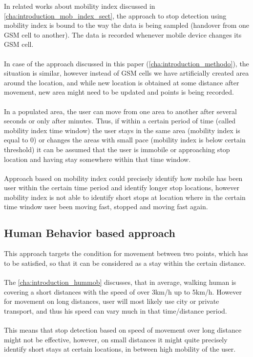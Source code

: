 In related works about mobility index discussed in \autoref{cha:introduction_mob_index_sect}, the approach to stop detection using mobility index is bound to the way the data is being sampled (handover from one GSM cell to another). The data is recorded whenever mobile device changes its GSM cell. 
\\\\
In case of the approach discussed in this paper (\autoref{cha:introduction_methodo}), the situation is similar, however instead of GSM cells we have artificially created area around the location, and while new location is obtained at some distance after movement, new area might need to be updated and points is being recorded.
\\\\
In a populated area, the user can move from one area to another after several seconds or only after minutes. Thus, if within a certain
period of time (called mobility index time window) the user stays in the same area (mobility index is equal to 0) or changes the areas with small pace (mobility index is below certain threshold) it can be assumed that the user is immobile or approaching stop location and having stay somewhere within that time window. 
\\\\
Approach based on mobility index could precisely identify how mobile has been user within the certain time period and identify longer stop locations, however mobility index is not able to identify short stops at location where in the certain time window user been moving fast, stopped and moving fast again. 

\subsection{Human Behavior based approach}

This approach targets the condition for movement between two points, which has to be satisfied, so that it can be considered as a stay within the certain distance. 
\\\\
The \autoref{cha:introduction_hummob} discusses, that in average, walking human is covering a short distances with the speed of over 3km/h up to 5km/h. However for movement on long distances, user will most likely use city or private transport, and thus his speed can vary much in that time/distance period.
\\\\
This means that stop detection based on speed of movement over long distance might not be effective, however, on small distances it might quite precisely identify short stays at certain locations, in between high mobility of the user.  

